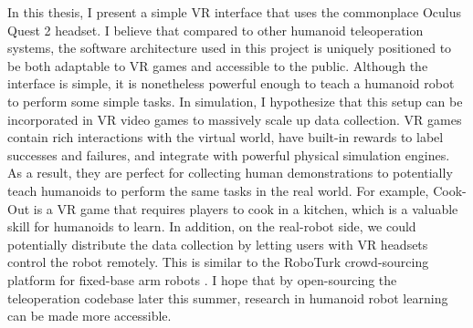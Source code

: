 In this thesis, I present a simple VR interface that uses the commonplace Oculus Quest 2 headset. I believe that compared to other humanoid teleoperation systems, the software architecture used in this project is uniquely positioned to be both adaptable to VR games and accessible to the public. Although the interface is simple, it is nonetheless powerful enough to teach a humanoid robot to perform some simple tasks. In simulation, I hypothesize that this setup can be incorporated in VR video games to massively scale up data collection. VR games contain rich interactions with the virtual world, have built-in rewards to label successes and failures, and integrate with powerful physical simulation engines. As a result, they are perfect for collecting human demonstrations to potentially teach humanoids to perform the same tasks in the real world. For example, Cook-Out is a VR game that requires players to cook in a kitchen, which is a valuable skill for humanoids to learn. In addition, on the real-robot side, we could potentially distribute the data collection by letting users with VR headsets control the robot remotely. This is similar to the RoboTurk crowd-sourcing platform for fixed-base arm robots \cite{mandlekar2018roboturk}. I hope that by open-sourcing the teleoperation codebase later this summer, research in humanoid robot learning can be made more accessible. 

